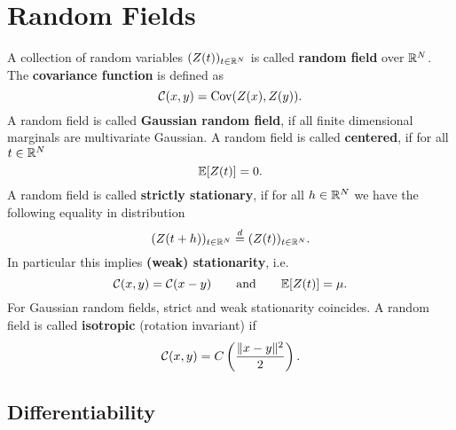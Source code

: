 \section{Random Fields}

\begin{definition}
	A collection of random variables \((Z(t))_{t\in\mathbb{R}^N}\) is called
	\textbf{random field} over \(\mathbb{R}^N\). The \textbf{covariance function}
	is defined as
	\begin{equation*}
		\mathcal{C}(x,y) = \operatorname{Cov}(Z(x), Z(y)).
	\end{equation*}
	A random field is called \textbf{Gaussian random field}, if all finite
	dimensional marginals are multivariate Gaussian.
	A random field is called \textbf{centered}, if for all \(t\in\mathbb{R}^N\)
	\[
		\mathbb{E}[Z(t)] = 0.
	\]
	A random field is called \textbf{strictly stationary}, if for all
	\(h\in\mathbb{R}^N\) we have the following equality in distribution
	\[
		(Z(t+h))_{t\in\mathbb{R}^N} \overset{d}= (Z(t))_{t\in\mathbb{R}^N}.
	\]
	In particular this implies	\textbf{(weak) stationarity}, i.e.
	\begin{equation*}
		\mathcal{C}(x,y) = \mathcal{C}(x-y)\qquad \text{and} \qquad \mathbb{E}[Z(t)]=\mu.
	\end{equation*}
	For Gaussian random fields, strict and weak stationarity coincides.
	A random field is called \textbf{isotropic} (rotation invariant) if	
	\begin{equation*}
		\mathcal{C}(x,y) = C\left(\frac{\|x-y\|^2}{2}\right).
	\end{equation*}
\end{definition}

\subsection{Differentiability}


